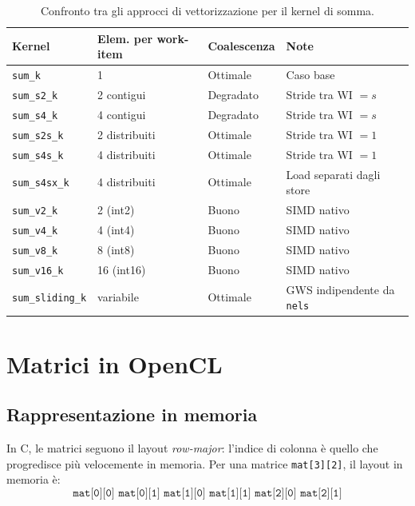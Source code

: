 \begin{table}[htbp]
\centering
\small
\begin{tabular}{llll}
\toprule
\textbf{Kernel} & \textbf{Elem. per work-item} & \textbf{Coalescenza} & \textbf{Note} \\
\midrule
\texttt{sum\_k}        & 1           & Ottimale   & Caso base \\
\texttt{sum\_s2\_k}    & 2 contigui  & Degradato  & Stride tra WI $= s$ \\
\texttt{sum\_s4\_k}    & 4 contigui  & Degradato  & Stride tra WI $= s$ \\
\texttt{sum\_s2s\_k}   & 2 distribuiti & Ottimale & Stride tra WI $= 1$ \\
\texttt{sum\_s4s\_k}   & 4 distribuiti & Ottimale & Stride tra WI $= 1$ \\
\texttt{sum\_s4sx\_k}  & 4 distribuiti & Ottimale & Load separati dagli store \\
\texttt{sum\_v2\_k}    & 2 (int2)    & Buono      & SIMD nativo \\
\texttt{sum\_v4\_k}    & 4 (int4)    & Buono      & SIMD nativo \\
\texttt{sum\_v8\_k}    & 8 (int8)    & Buono      & SIMD nativo \\
\texttt{sum\_v16\_k}   & 16 (int16)  & Buono      & SIMD nativo \\
\texttt{sum\_sliding\_k} & variabile & Ottimale   & GWS indipendente da \texttt{nels} \\
\bottomrule
\end{tabular}
\caption{Confronto tra gli approcci di vettorizzazione per il kernel di somma.}
\label{tab:vecsum_comparison}
\end{table}

\section{Matrici in OpenCL}\label{sec:opencl_ott_matrici}

\subsection{Rappresentazione in memoria}

In C, le matrici seguono il layout \emph{row-major}: l'indice di colonna è quello che progredisce più velocemente in memoria. Per una matrice \texttt{mat[3][2]}, il layout in memoria è:
\[
\texttt{mat[0][0]\ mat[0][1]\ mat[1][0]\ mat[1][1]\ mat[2][0]\ mat[2][1]}
\]


